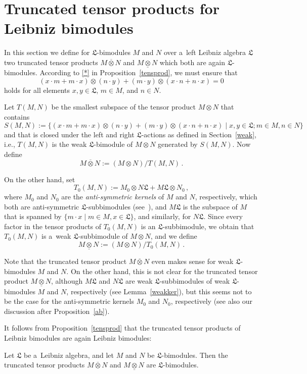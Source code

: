 \documentclass{jonasart}
\newcommand{\lf}{\mathfrak{L}}
\newcommand{\ovo}{\overline{\otimes}}
\newcommand{\und}{\underline{\otimes}}
\begin{document}
	\section{Truncated tensor products for Leibniz bimodules}\label{truncated}

	In this section we define for $\lf$-bimodules $M$ and $N$
	over a~left Leibniz algebra $\lf$ two truncated tensor products
	$M\ovo N$ and $M\und N$ which both are again $\lf$-bimodules. According to \eqref{*} in Proposition~\ref{tensprod}, we must ensure that
	\[
		(x\cdot m+m\cdot x)\otimes (n\cdot y)+(m\cdot y)\otimes
		(x\cdot n+n\cdot x)=0
	\]
	holds for all elements $x,y\in\lf$, $m\in M$, and $n\in N$.

    Let $T(M,N)$ be the smallest subspace of the tensor product 	$M\otimes N$ that contains
	\[
		S(M,N):=\{(x\cdot m+m\cdot x)\otimes (n\cdot y)+(m\cdot y)
		\otimes(x\cdot n+n\cdot x)\mid x,y\in\lf;m\in M,n\in N\}
	\]
	and that is closed under the left and right $\lf$-actions as defined in Section~\ref{weak}, i.e., $T(M,N)$ is the weak $\lf$-bimodule of $M\otimes N$ generated by $S(M,N)$. Now define
	\[
		M\ovo N:=(M\otimes N)/T(M,N)\,.
	\]

	On the other hand, set
	\[
		T_0 (M,N):=M_0\otimes N\lf+M\lf\otimes N_0\,,
	\]
	where $M_0$ and $N_0$ are the \emph{anti-symmetric kernels\/}
	of $M$ and $N$, respectively, which both are anti-symmetric
	$\lf$-subbimodules (see~\cite[Proposition 3.12]{F1}), and $M\lf$
	is the subspace of $M$ that is spanned by $\{m\cdot x\mid m\in
	M,x\in\lf\}$, and similarly, for $N\lf$. Since every factor in the tensor products of $T_0 (M,N)$ is an $\lf$-subbimodule, we obtain that $T_0 (M,N)$ is a~weak
	$\lf$-subbimodule of $M\otimes N$, and we define
	\[
		M\und N:=(M\otimes N)/T_0 (M,N)\,.
	\]

	\begin{remark}
		{Note that the truncated tensor product $M\ovo N$ even makes sense for weak $\lf$-bimodules $M$ and $N$. On the other hand, this is not clear for the truncated tensor product
		$M\und N$, although $M\lf$ and $N\lf$ are weak $\lf$-subbimodules of weak $\lf$-bimodules $M$ and $N$, respectively (see Lemma~\ref{weakker}), but this seems not to be the case for the anti-symmetric kernels $M_0$ and $N_0$, respectively (see also our discussion after Proposition~\ref{ab}).}
	\end{remark}
	It follows from Proposition~\ref{tensprod} that the truncated tensor products of Leibniz bimodules are again Leibniz bimodules:
	\begin{proposition}
		Let $\lf$ be a~Leibniz algebra, and let $M$ and $N$ be
		$\lf$-bimodules. Then the truncated tensor products $M\ovo N$
		and $M\und N$ are $\lf$-bimodules.
	\end{proposition}
\end{document}
